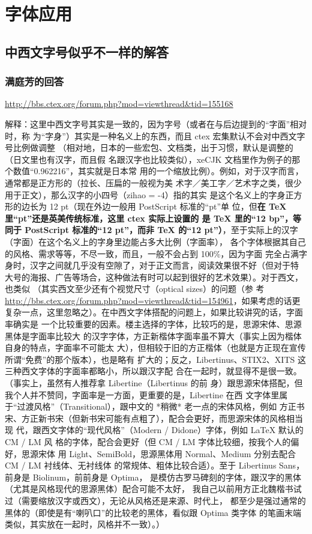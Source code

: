 \chapter{字体应用}

\section{中西文字号似乎不一样的解答}
\subsection{满庭芳的回答}
\url{http://bbs.ctex.org/forum.php?mod=viewthread&tid=155168}

解释：这里中西文字号其实是一致的，因为字号（或者在与后边提到的“字面”相对时，称
为“字身”）其实是一种名义上的东西，而且 ctex 宏集默认不会对中西文字号比例做调整
（相对地，日本的一些宏包、文档类，出于习惯，默认是调整的（日文里也有汉字，而且假
名跟汉字也比较类似），xeCJK 文档里作为例子的那个数值“0.962216”，其实就是日本常
用的一个缩放比例）。例如，对于汉字而言，通常都是正方形的（拉长、压扁的一般视为美
术字／美工字／艺术字之类，很少用于正文），那么汉字的小四号（zihao = -4）指的其实
是这个名义上的字身正方形的边长为 12 pt（现在外边一般用 PostScript 标准的“pt”单
位，但\textbf{在 TeX 里“pt”还是英美传统标准，这里 ctex 实际上设置的
  是 TeX 里的“12 bp”，等同于 PostScript 标准的“12 pt”，而非 TeX 的“12
  pt”）}，至于实际上的汉字（字面）在这个名义上的字身里边能占多大比例（字面率），
各个字体根据其自己的风格、需求等等，不尽一致，而且，一般不会占到 100\%，因为字面
完全占满字身时，汉字之间就几乎没有空隙了，对于正文而言，阅读效果很不好（但对于特
大号的海报、广告等场合，这种做法有时可以起到很好的艺术效果）。对于西文，也类似
（其实西文至少还有个视觉尺寸（optical sizes）的问题（参
考 \url{http://bbs.ctex.org/forum.php?mod=viewthread&tid=154961}，如果考虑的话更
复杂一点，这里忽略之）。在中西文字体搭配的问题上，如果比较讲究的话，字面率确实是
一个比较重要的因素。楼主选择的字体，比较巧的是，思源宋体、思源黑体是字面率比较大
的汉字字体，方正新楷体字面率虽不算大（事实上因为楷体自身的特点，字面率不可能太
大），但相较于旧的方正楷体（也就是方正现在宣传所谓“免费”的那个版本），也是略有
扩大的；反之，Libertinus、STIX2、XITS 这三种西文字体的字面率都略小，所以跟汉字配
合在一起时，就显得不是很一致。（事实上，虽然有人推荐拿 Libertine（Libertinus 的前
身）跟思源宋体搭配，但我个人并不赞同，字面率是一方面，更重要的是，Libertine 在西
文字体里属于“过渡风格”（Transitional），跟中文的 *稍微* 老一点的宋体风格，例如
方正书宋、方正新书宋（但新书宋可能有点粗了），配合会更好，而思源宋体的风格相当现
代，跟西文字体的“现代风格”（Modern / Didone）字体，例如 LaTeX 默认的 CM / LM 风
格的字体，配合会更好（但 CM / LM 字体比较细，按我个人的偏好，思源宋体
用 Light、SemiBold，思源黑体用 Normal、Medium 分别去配合 CM / LM 衬线体、无衬线体
的常规体、粗体比较合适）。至于 Libertinus Sans，前身是 Biolinum，前前身是 Optima，
是模仿古罗马碑刻的字体，跟汉字的黑体（尤其是风格现代的思源黑体）配合可能不太好，
我自己以前用方正北魏楷书试过（需要缩放汉字或西文），无论从风格还是来源、时代上，
都至少是强过通常的黑体的（即使是有“喇叭口”的比较老的黑体，看似跟 Optima 类字体
的笔画末端类似，其实放在一起时，风格并不一致）。）


